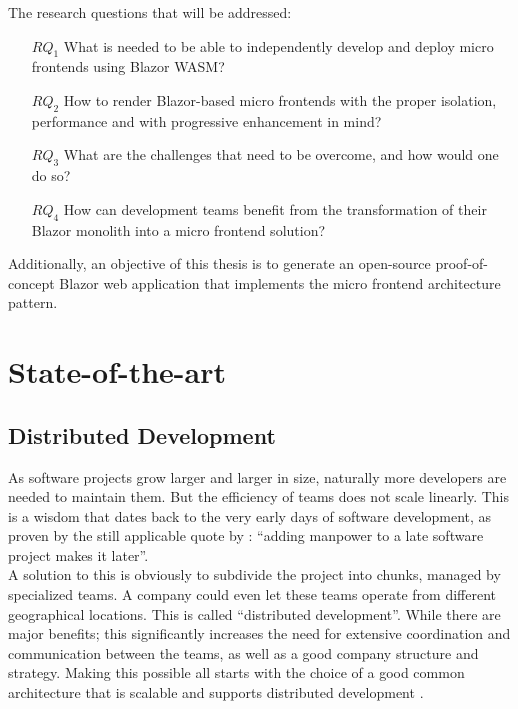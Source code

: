 The research questions that will be addressed:
\begin{itemize}
    \item[$RQ_1$] What is needed to be able to independently develop and
    deploy micro frontends using Blazor WASM?
    \item[$RQ_2$] How to render Blazor-based micro frontends with the proper
    isolation, performance and with progressive
    enhancement
    in mind?
    \item[$RQ_3$] What are the challenges that need to be overcome, and how
    would one do so? 
    \item[$RQ_4$] How can development teams benefit from the transformation
    of their Blazor monolith into a micro frontend solution?
\end{itemize}

Additionally, an objective of this thesis is to generate an open-source
proof-of-concept Blazor web application that implements the micro frontend
architecture pattern.




\section{State-of-the-art}
\label{sec:state-of-the-art}

\subsection{Distributed Development}
As software projects grow larger and larger in size, naturally more developers
are needed to maintain them. But the efficiency of teams does not scale
linearly. This is a wisdom that dates back to the very early days of software
development, as proven by the still applicable quote by \textcite{Brooks_1975}:
``adding manpower to a late software project makes it later''.\\
A solution to this is obviously to subdivide the project into chunks, managed by
specialized teams. A company could even let these teams operate from different
geographical locations. This is called ``distributed development''. While there
are major benefits; this significantly increases the need for extensive
coordination and communication between the teams, as well as a good company
structure and strategy. Making this possible all starts with the choice of a
good common architecture that is scalable and supports distributed development
\autocite{Yuhong_2008}. 


